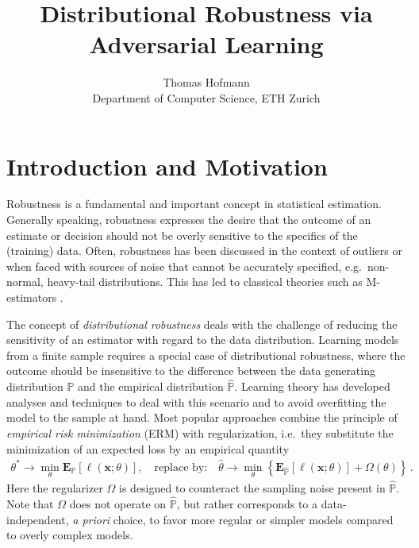 \documentclass{article}
\title{
	Distributional Robustness via Adversarial Learning
}
\author{
	Thomas Hofmann \\[1mm] Department of Computer Science, ETH Zurich
}
\newcommand{\x}{{\mathbf x}}
\newcommand{\E}{{\mathbf E}}
\renewcommand{\P}{{\mathbb P}}
\begin{document}
\maketitle 

\section{Introduction and Motivation}

Robustness is a fundamental and important concept in statistical estimation. Generally speaking, robustness expresses the desire  that the outcome of an estimate or decision should not be overly sensitive to the specifics of the (training) data. Often, robustness has been discussed in the context of outliers or when faced with sources of noise that cannot be accurately specified, e.g.~non-normal, heavy-tail distributions. This has led to classical theories such as M-estimators \cite{huber1981robust}.

The concept of \textit{distributional robustness} deals with the challenge of reducing the sensitivity of an estimator with regard to the data distribution. Learning models from a finite sample requires a special case of distributional robustness, where the outcome should be insensitive to the difference between the data generating distribution $\P$ and the empirical distribution $\hat \P$. Learning theory has developed analyses and techniques to deal with this scenario and to avoid overfitting the model to the sample at hand. Most popular approaches combine the principle of \textit{empirical risk minimization} (ERM) with regularization, i.e.~they substitute the minimization of an expected loss by an empirical quantity
\begin{align}
\theta^* \rightarrow \min_\theta \E_\P[\ell (\x; \theta)], \quad \text{replace by:} \quad
\hat\theta \rightarrow \min_\theta \left\{ \E_{\hat \P}\left[\ell(\x; \theta) \right]+ \Omega(\theta) \right\} \,.
\end{align} 
Here the regularizer $\Omega$ is designed to counteract the sampling noise present in $\hat \P$. Note that $\Omega$ does not operate on $\hat \P$, but rather corresponds to a data-independent, \textit{a priori} choice, to favor more regular or simpler models compared to overly complex models. 
\end{document}
